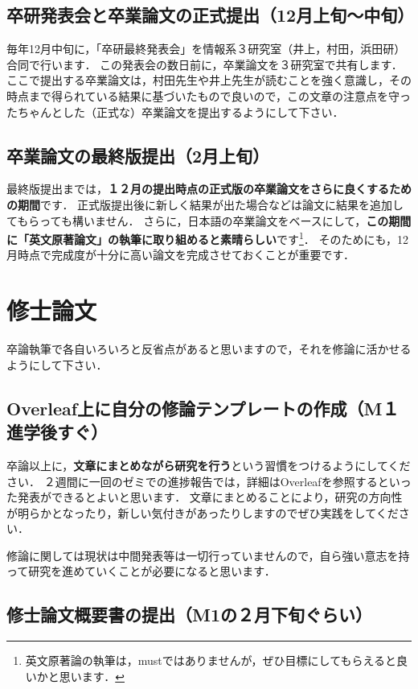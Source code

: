 \documentclass[dvipdfmx,autodetect-engine]{jsreport}
\begin{document}
\subsection{卒研発表会と卒業論文の正式提出（12月上旬〜中旬）}

毎年12月中旬に，「卒研最終発表会」を情報系３研究室（井上，村田，浜田研）合同で行います．
この発表会の数日前に，卒業論文を３研究室で共有します．ここで提出する卒業論文は，村田先生や井上先生が読むことを強く意識し，その時点まで得られている結果に基づいたもので良いので，この文章の注意点を守ったちゃんとした（正式な）卒業論文を提出するようにして下さい．

\subsection{卒業論文の最終版提出（2月上旬）}

最終版提出までは，\textbf{１２月の提出時点の正式版の卒業論文をさらに良くするための期間}です．
正式版提出後に新しく結果が出た場合などは論文に結果を追加してもらっても構いません．
さらに，日本語の卒業論文をベースにして，\textbf{この期間に「英文原著論文」の執筆に取り組めると素晴らしい}です\footnote{英文原著論の執筆は，mustではありませんが，ぜひ目標にしてもらえると良いかと思います．}．
そのためにも，12月時点で完成度が十分に高い論文を完成させておくことが重要です．

\section{修士論文}

卒論執筆で各自いろいろと反省点があると思いますので，それを修論に活かせるようにして下さい．

\subsection{Overleaf上に自分の修論テンプレートの作成（M１進学後すぐ）}

卒論以上に，\textbf{文章にまとめながら研究を行う}という習慣をつけるようにしてください．
２週間に一回のゼミでの進捗報告では，詳細はOverleafを参照するといった発表ができるとよいと思います．
文章にまとめることにより，研究の方向性が明らかとなったり，新しい気付きがあったりしますのでぜひ実践をしてください．

修論に関しては現状は中間発表等は一切行っていませんので，自ら強い意志を持って研究を進めていくことが必要になると思います．


\subsection{修士論文概要書の提出（M1の２月下旬ぐらい）}
\end{document}
